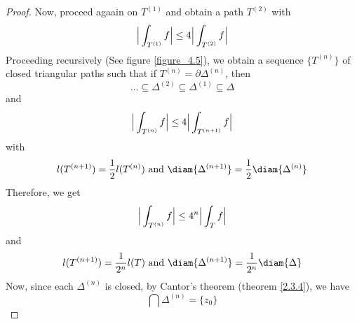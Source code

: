 \begin{proof}
    Now, proceed agaain on $T^{(1)}$ and obtain a path $T^{(2)}$ with
    \begin{equation*}
        \Big{|} \int_{T^{(1)}}{f} \Big{|} \leq 4\Big{|} \int_{T^{(2)}}{f} \Big{|}
    \end{equation*}
    Proceeding recursively (See figure \ref{figure_4.5}), we obtain a sequence
    $\{T^{(n)}\}$ of closed triangular paths such that if
    $T^{(n)}=\partial{\Delta^{(n)}}$, then
    \begin{equation*}
        \dots \subseteq \Delta^{(2)} \subseteq \Delta^{(1)} \subseteq \Delta
    \end{equation*}
    and
    \begin{equation*}
        \Big{|} \int_{T^{(n)}}{f} \Big{|} \leq 4\Big{|} \int_{T^{(n+1)}}{f} \Big{|}
    \end{equation*}
    with
    \begin{equation*}
        l(T^{(n+1)})=\frac{1}{2}l(T^{(n)}) \text{ and }
        \diam{\Delta^{(n+1)}}=\frac{1}{2}\diam{\Delta^{(n)}}
    \end{equation*}
    Therefore, we get
    \begin{equation*}
        \Big{|} \int_{T^{(n)}}{f} \Big{|} \leq 4^n\Big{|} \int_T{f} \Big{|}
    \end{equation*}
    and
    \begin{equation*}
        l(T^{(n+1)})=\frac{1}{2^n}l(T) \text{ and }
        \diam{\Delta^{(n+1)}}=\frac{1}{2^n}\diam{\Delta}
    \end{equation*}
    Now, since each $\Delta^{(n)}$ is closed, by Cantor's theorem (theorem
    \ref{2.3.4}), we have
    \begin{equation*}
        \bigcap{\Delta^{(n)}}=\{z_0\}
    \end{equation*}


\end{proof}
